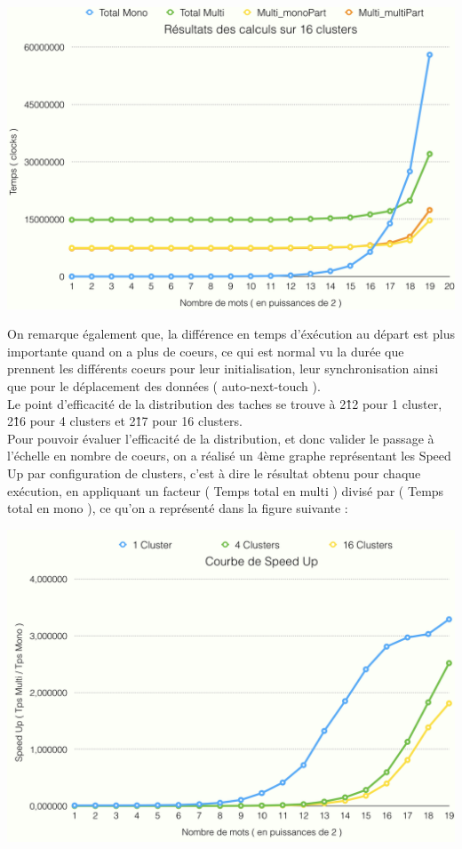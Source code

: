 \begin{center}
\includegraphics[scale=0.4]{images/graph_16.png}
\end{center}

On remarque également que, la différence en temps d'éxécution au départ est plus importante quand on a plus de coeurs, ce qui est normal vu la durée que prennent les différents coeurs pour leur initialisation, leur synchronisation ainsi que pour le déplacement des données ( auto-next-touch ).\\
Le point d'efficacité de la distribution des taches se trouve à 2\^12 pour 1 cluster, 2\^16 pour 4 clusters et 2\^17 pour 16 clusters.\\

Pour pouvoir évaluer l'efficacité de la distribution, et donc valider le passage à l'échelle en nombre de coeurs, on a réalisé un 4ème graphe représentant les Speed Up par configuration de clusters, c'est à dire le résultat obtenu pour chaque exécution, en appliquant un facteur ( Temps total en multi ) divisé par ( Temps total en mono ), ce qu'on a représenté dans la figure suivante :\\

\begin{center}
\includegraphics[scale=0.4]{images/graph_speedup.png}
\end{center}
